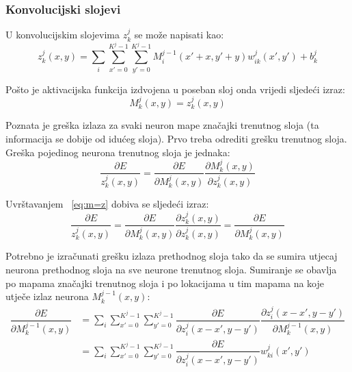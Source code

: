 \documentclass[times, utf8, zavrsni, numeric]{fer}
\begin{document}
\subsubsection{Konvolucijski slojevi}
U konvolucijskim slojevima $z_k^j$ se može napisati kao:
\begin{equation}
z^j_k (x, y) = \sum_i \sum_{x'=0}^{K^j-1} \sum_{y'=0}^{K^j-1} M^{j-1}_i (x' + x, y' + y) w^j_{ik} (x', y') + b^j_k
\end{equation}

Pošto je aktivacijska funkcija izdvojena u poseban sloj onda vrijedi sljedeći izraz:
\begin{equation}\label{eq:m=z}
M^j_k (x, y) = z^j_k (x, y)
\end{equation}

Poznata je greška izlaza za svaki neuron mape značajki trenutnog sloja (ta informacija se dobije od idućeg sloja). Prvo treba odrediti grešku trenutnog sloja. Greška pojedinog neurona trenutnog sloja je jednaka: 
\begin{equation}
\dfrac{\partial E}{z^j_k (x, y)} = \dfrac{\partial E}{\partial M^j_k (x, y)} \dfrac{\partial M^j_k (x, y)}{\partial z^j_k (x, y)}
\end{equation}

Uvrštavanjem ~\ref{eq:m=z} dobiva se sljedeći izraz:
\begin{equation}
\dfrac{\partial E}{z^j_k (x, y)} = \dfrac{\partial E}{\partial M^j_k (x, y)} \dfrac{\partial z^j_k (x, y)}{\partial z^j_k (x, y)} = \dfrac{\partial E}{\partial M^j_k (x, y)}
\end{equation}

Potrebno je izračunati  grešku izlaza prethodnog sloja tako da se sumira utjecaj neurona prethodnog sloja na sve neurone trenutnog sloja. Sumiranje se obavlja po mapama značajki trenutnog sloja i po lokacijama u tim mapama na koje utječe izlaz neurona $M^{j-1}_k (x, y)$:
\begin{equation}\label{eq:conv-sloj-err}
\begin{split}
\dfrac{\partial E}{\partial M^{j-1}_k (x, y)} &= \sum_i \sum_{x'=0}^{K^j-1} \sum_{y'=0}^{K^j-1} \dfrac{\partial E}{\partial z^j_{i} (x - x',y - y')} \dfrac{\partial z^j_{i} (x - x',y - y')}{\partial M^{j-1}_k (x, y)} \\
 &= \sum_i \sum_{x'=0}^{K^j-1} \sum_{y'=0}^{K^j-1} \dfrac{\partial E}{\partial z^j_{i} (x - x', y - y')} w^j_{ki}(x', y')
\end{split}
\end{equation}
\end{document}
